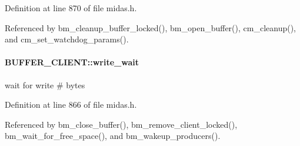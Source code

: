 Definition at line 870 of file midas.h.

Referenced by bm\_\-cleanup\_\-buffer\_\-locked(), bm\_\-open\_\-buffer(), cm\_\-cleanup(), and cm\_\-set\_\-watchdog\_\-params().
\paragraph[{write\_\-wait}]{ {\bf BUFFER\_\-CLIENT::write\_\-wait}}\hfill\label{structBUFFER__CLIENT_a884b0a6395661ef9f711fa3ca7bc19b6}
wait for write \# bytes 

Definition at line 866 of file midas.h.

Referenced by bm\_\-close\_\-buffer(), bm\_\-remove\_\-client\_\-locked(), bm\_\-wait\_\-for\_\-free\_\-space(), and bm\_\-wakeup\_\-producers().